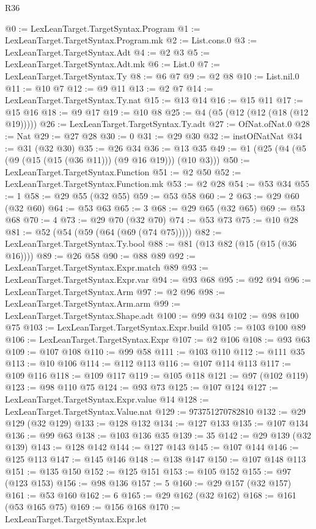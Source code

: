 \begin{lexlean}{R36}
\begin{coremodule}
@0 := LexLeanTarget.TargetSyntax.Program
@1 := LexLeanTarget.TargetSyntax.Program.mk
@2 := List.cons.{0}
@3 := LexLeanTarget.TargetSyntax.Adt
@4 := @2 @3
@5 := LexLeanTarget.TargetSyntax.Adt.mk
@6 := List.{0}
@7 := LexLeanTarget.TargetSyntax.Ty
@8 := @6 @7
@9 := @2 @8
@10 := List.nil.{0}
@11 := @10 @7
@12 := @9 @11
@13 := @2 @7
@14 := LexLeanTarget.TargetSyntax.Ty.nat
@15 := @13 @14
@16 := @15 @11
@17 := @15 @16
@18 := @9 @17
@19 := @10 @8
@25 := @4 (@5 (@12 (@12 (@18 (@12 @19)))))
@26 := LexLeanTarget.TargetSyntax.Ty.adt
@27 := OfNat.ofNat.{0}
@28 := Nat
@29 := @27 @28
@30 := 0
@31 := @29 @30
@32 := instOfNatNat
@34 := @31 (@32 @30)
@35 := @26 @34
@36 := @13 @35
@49 := @1 (@25 (@4 (@5 (@9 (@15 (@15 (@36 @11))) (@9 @16 @19))) (@10 @3)))
@50 := LexLeanTarget.TargetSyntax.Function
@51 := @2 @50
@52 := LexLeanTarget.TargetSyntax.Function.mk
@53 := @2 @28
@54 := @53 @34
@55 := 1
@58 := @29 @55 (@32 @55)
@59 := @53 @58
@60 := 2
@63 := @29 @60 (@32 @60)
@64 := @53 @63
@65 := 3
@68 := @29 @65 (@32 @65)
@69 := @53 @68
@70 := 4
@73 := @29 @70 (@32 @70)
@74 := @53 @73
@75 := @10 @28
@81 := @52 (@54 (@59 (@64 (@69 (@74 @75)))))
@82 := LexLeanTarget.TargetSyntax.Ty.bool
@88 := @81 (@13 @82 (@15 (@15 (@36 @16))))
@89 := @26 @58
@90 := @88 @89
@92 := LexLeanTarget.TargetSyntax.Expr.match @89
@93 := LexLeanTarget.TargetSyntax.Expr.var
@94 := @93 @68
@95 := @92 @94
@96 := LexLeanTarget.TargetSyntax.Arm
@97 := @2 @96
@98 := LexLeanTarget.TargetSyntax.Arm.arm
@99 := LexLeanTarget.TargetSyntax.Shape.adt
@100 := @99 @34
@102 := @98 @100 @75
@103 := LexLeanTarget.TargetSyntax.Expr.build
@105 := @103 @100 @89
@106 := LexLeanTarget.TargetSyntax.Expr
@107 := @2 @106
@108 := @93 @63
@109 := @107 @108
@110 := @99 @58
@111 := @103 @110
@112 := @111 @35
@113 := @10 @106
@114 := @112 @113
@116 := @107 @114 @113
@117 := @109 @116
@118 := @109 @117
@119 := @105 @118
@121 := @97 (@102 @119)
@123 := @98 @110 @75
@124 := @93 @73
@125 := @107 @124
@127 := LexLeanTarget.TargetSyntax.Expr.value @14
@128 := LexLeanTarget.TargetSyntax.Value.nat
@129 := 973751270782810
@132 := @29 @129 (@32 @129)
@133 := @128 @132
@134 := @127 @133
@135 := @107 @134
@136 := @99 @63
@138 := @103 @136 @35
@139 := 35
@142 := @29 @139 (@32 @139)
@143 := @128 @142
@144 := @127 @143
@145 := @107 @144
@146 := @125 @113
@147 := @145 @146
@148 := @138 @147
@150 := @107 @148 @113
@151 := @135 @150
@152 := @125 @151
@153 := @105 @152
@155 := @97 (@123 @153)
@156 := @98 @136
@157 := 5
@160 := @29 @157 (@32 @157)
@161 := @53 @160
@162 := 6
@165 := @29 @162 (@32 @162)
@168 := @161 (@53 @165 @75)
@169 := @156 @168
@170 := LexLeanTarget.TargetSyntax.Expr.let

\end{coremodule}
\end{lexlean}
